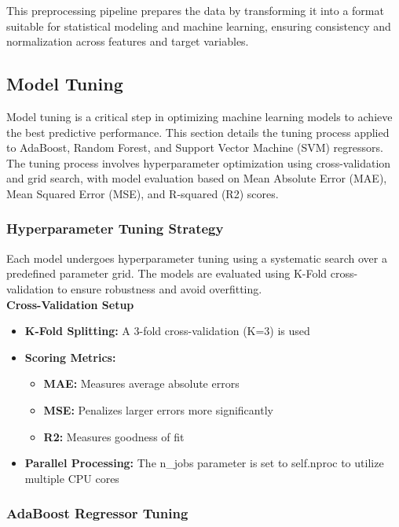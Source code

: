 This preprocessing pipeline prepares the data by transforming it into a format suitable for statistical modeling and machine
learning, ensuring consistency and normalization across features and target variables.

\subsection{Model Tuning}\label{sec:model_tuning}

Model tuning is a critical step in optimizing machine learning models to achieve the best predictive performance.
This section details the tuning process applied to AdaBoost, Random Forest, and Support Vector Machine (SVM)
regressors. The tuning process involves hyperparameter optimization using cross-validation and grid search, with
model evaluation based on Mean Absolute Error (MAE), Mean Squared Error (MSE), and R-squared (R2) scores.

\subsubsection{Hyperparameter Tuning Strategy}

Each model undergoes hyperparameter tuning using a systematic search over a predefined parameter grid. The
models are evaluated using K-Fold cross-validation to ensure robustness and avoid overfitting. \\

\textbf{Cross-Validation Setup}

\begin{itemize}
    \item \textbf{K-Fold Splitting:} A 3-fold cross-validation (K=3) is used
    \item \textbf{Scoring Metrics:}
    \begin{itemize}
        \item \textbf{MAE:} Measures average absolute errors
        \item \textbf{MSE:} Penalizes larger errors more significantly
        \item \textbf{R2:} Measures goodness of fit
    \end{itemize}
    \item \textbf{Parallel Processing:} The n\_jobs parameter is set to self.nproc to utilize multiple CPU cores
\end{itemize}

\subsubsection{AdaBoost Regressor Tuning}\label{sec:adaboost_regressor_tuning}

